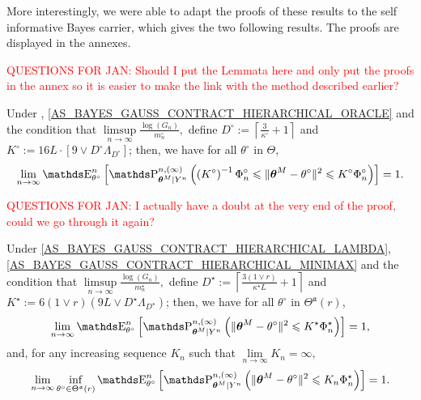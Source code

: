 \medskip

More interestingly, we were able to adapt the proofs of these results to the self informative Bayes carrier, which gives the two following results.
The proofs are displayed in the annexes.

\textcolor{red}{QUESTIONS FOR JAN: Should I put the Lemmata here and only put the proofs in the annex so it is easier to make the link with the method described earlier?}

\begin{thm}\label{THM_BAYES_IGSSM_KNOWN_IID_ORACLE_NP}
Under , \textsc{\cref{AS_BAYES_GAUSS_CONTRACT_HIERARCHICAL_ORACLE}} and the condition that $\limsup\limits_{n \rightarrow \infty} \frac{\log\left(G_{n}\right)}{m_{n}^{\circ}},$ define $D^{\circ} := \left\lceil \frac{3}{\kappa^{\circ}} + 1 \right\rceil$ and $K^{\circ} := 16 L \cdot \left[9 \vee D^{\circ} \Lambda_{D^{\circ}}\right]$; then, we have for all $\theta^{\circ}$ in $\Theta$,
\[\lim\limits_{n \rightarrow \infty} \E_{\theta^{\circ}}^{n}\left[\P_{\boldsymbol{\theta}^{M} \vert Y^{n}}^{n, (\infty)}\left(\left(K^{\circ}\right)^{-1} \Phi_{n}^{\circ} \leq \Vert \boldsymbol{\theta}^{M} - \theta^{\circ} \Vert^{2} \leq K^{\circ} \Phi_{n}^{\circ} \right)\right] = 1.\]
\end{thm}

\begin{il}
\ilEnd
\end{il}

\textcolor{red}{QUESTIONS FOR JAN: I actually have a doubt at the very end of the proof, could we go through it again?}

\begin{thm}\label{THM_BAYES_IGSSM_KNOWN_IID_MINIMAX_NP}
Under \textsc{\cref{AS_BAYES_GAUSS_CONTRACT_HIERARCHICAL_LAMBDA}}, \textsc{\cref{AS_BAYES_GAUSS_CONTRACT_HIERARCHICAL_MINIMAX}} and the condition that $\limsup\limits_{n \rightarrow \infty} \frac{\log\left(G_{n}\right)}{m_{n}^{\star}},$ define $D^{\star} := \left\lceil \frac{3 \left(1 \vee r\right)}{\kappa^{\star} L} + 1 \right\rceil$ and $K^{\star} := 6 (1 \vee r) (9L \vee D^{\star} \Lambda_{D^{\star}})$; then, we have for all $\theta^{\circ}$ in $\Theta^{\mathfrak{a}}(r)$,
\[\lim\limits_{n \rightarrow \infty} \E_{\theta^{\circ}}^{n}\left[\P_{\boldsymbol{\theta}^{M} \vert Y^{n}}^{n, (\infty)}\left(\Vert \boldsymbol{\theta}^{M} - \theta^{\circ} \Vert^{2} \leq K^{\star} \Phi_{n}^{\star} \right)\right] = 1,\]
and, for any increasing sequence $K_{n}$ such that $\lim\limits_{n \rightarrow \infty} K_{n} = \infty,$
\[\lim\limits_{n \rightarrow \infty} \inf\limits_{\theta^{\circ} \in \Theta^{\mathfrak{a}}(r)} \E_{\theta^{\circ}}^{n}\left[\P_{\boldsymbol{\theta}^{M} \vert Y^{n}}^{n, (\infty)}\left(\Vert \boldsymbol{\theta}^{M} - \theta^{\circ} \Vert^{2} \leq K_{n} \Phi_{n}^{\star} \right)\right] = 1.\]
\end{thm}

